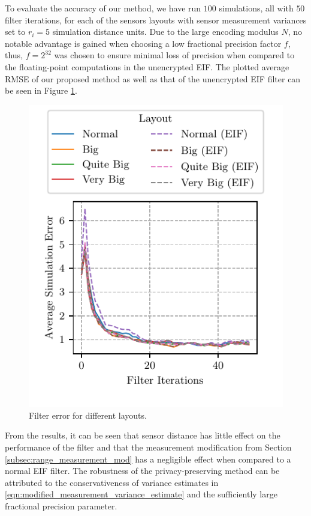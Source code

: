 \documentclass[10pt,journal,compsoc]{IEEEtran}
\theoremstyle{definition}
\theoremstyle{definition}
\theoremstyle{remark}
\begin{document}
To evaluate the accuracy of our method, we have run $100$ simulations, all with $50$ filter iterations, for each of the sensors layouts with sensor measurement variances set to $r_i=5$ simulation distance units. Due to the large encoding modulus $N$, no notable advantage is gained when choosing a low fractional precision factor $f$, thus, $f=2^{32}$ was chosen to ensure minimal loss of precision when compared to the floating-point computations in the unencrypted EIF. The plotted average RMSE of our proposed method as well as that of the unencrypted EIF filter can be seen in Figure \ref{fig:sim_layout_errors}.
\begin{figure}[htbp]
\centering
\includegraphics{images/layout_errors.pdf}
\caption{Filter error for different layouts.}
\label{fig:sim_layout_errors}
\end{figure}
From the results, it can be seen that sensor distance has little effect on the performance of the filter and that the measurement modification from Section \ref{subsec:range_measurement_mod} has a negligible effect when compared to a normal EIF filter. The robustness of the privacy-preserving method can be attributed to the conservativeness of variance estimates in \eqref{eqn:modified_measurement_variance_estimate} and the sufficiently large fractional precision parameter.
\end{document}
